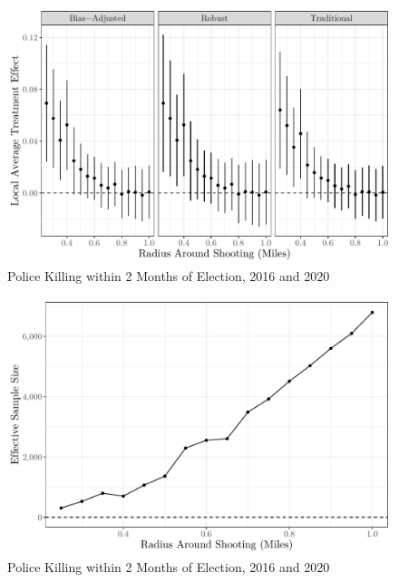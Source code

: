 \documentclass[
  12pt,
]{article}
\begin{document}
\begin{figure}[h]

{\centering \includegraphics{shoot_to_files/figure-latex/first-difference-1} 

}

\caption{\label{fig:map}Police Killing within 2 Months of Election, 2016 and 2020}\label{fig:first-difference}
\end{figure}

\begin{figure}[h]

{\centering \includegraphics{shoot_to_files/figure-latex/samples-1} 

}

\caption{\label{fig:map}Police Killing within 2 Months of Election, 2016 and 2020}\label{fig:samples}
\end{figure}
\end{document}

